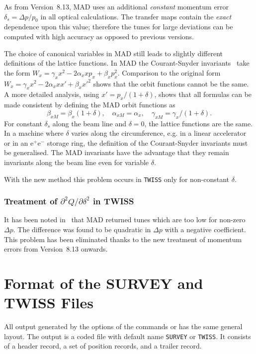As from Version~8.13, MAD uses an additional {\em constant} momentum
error \(\delta_s = \Delta p/p_0\) in all optical calculations.
The transfer maps contain the {\em exact} dependence upon this value;
therefore the tunes for large deviations can be computed with high
accuracy as opposed to previous versions.
 
The choice of canonical variables in MAD still
leads to slightly different definitions of the lattice functions.
In MAD the Courant-Snyder invariants~\cite{B-COU58}
take the form
\(W_x = \gamma_x x^2 - 2 \alpha_x x p_x + \beta_x p_x^2\).
Comparison to the original form
\(W_x = \gamma_x x^2 - 2 \alpha_x x x' + \beta_x x'^2\)
shows that the orbit functions cannot be the same.
A more detailed analysis, using \(x' = p_x / (1 + \delta)\),
shows that all formulas can be made consistent
by defining the MAD orbit functions as
\[
\beta_{xM} = \beta_x (1 + \delta) , \quad
\alpha_{xM} = \alpha_x , \quad
\gamma_{xM} = \gamma_x / (1 + \delta).
\]
For constant \(\delta_s\) along the beam line and \(\delta = 0\),
the lattice functions are the same.
In a machine where \(\delta\) varies along the circumference, e.g. in a
linear accelerator or in an e{}\(^+\)e\({}^-\) storage ring,
the definition of the
Courant-Snyder invariants must be generalised.
The MAD invariants have the advantage that they
remain invariants along the beam line even for variable \(\delta\).
 
With the new method this problem occurs in {\tt TWISS} only for
non-constant \(\delta\).
 
\subsection{Treatment of $\partial^2Q/\partial\delta^2$ in TWISS}
\label{S-treat}
It has been noted in~\cite{B-RUGGIERO} that MAD returned tunes which
are too low for non-zero \(\Delta p\).
The difference was found to be quadratic in \(\Delta p\) with a
negative coefficient.
This problem has been eliminated thanks to the new treatment 
of momentum errors from Version~8.13 onwards.
 
\appendix
\chapter{Format of the SURVEY and TWISS Files}
\label{A-TAPE3}
All output generated by the  options of the commands
 or  has the same general layout.
The output is a coded file with default name {\tt SURVEY} or {\tt TWISS}.
It consists of a header record,
a set of position records,
and a trailer record.
